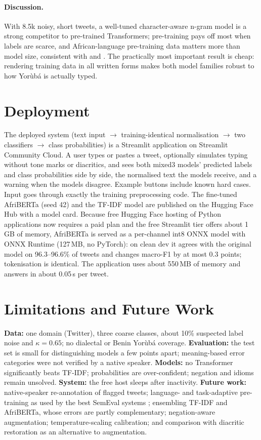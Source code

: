 \documentclass[11pt]{article}
\begin{document}
\paragraph{Discussion.} With 8.5k noisy, short tweets, a well-tuned character-aware n-gram model is a strong competitor to pre-trained Transformers; pre-training pays off most when labels are scarce, and African-language pre-training data matters more than model size, consistent with \citet{ogueji-etal-2021-small} and \citet{muhammad-etal-2023-afrisenti}. The practically most important result is cheap: rendering training data in all written forms makes both model families robust to how Yorùbá is actually typed.

\section{Deployment}
The deployed system (text input $\rightarrow$ training-identical normalisation $\rightarrow$ two classifiers $\rightarrow$ class probabilities) is a Streamlit application \citep{streamlit} on Streamlit Community Cloud. A user types or pastes a tweet, optionally simulates typing without tone marks or diacritics, and sees both mixed3 models' predicted labels and class probabilities side by side, the normalised text the models receive, and a warning when the models disagree. Example buttons include known hard cases. Input goes through exactly the training preprocessing code. The fine-tuned AfriBERTa (seed 42) and the TF-IDF model are published on the Hugging Face Hub with a model card. Because free Hugging Face hosting of Python applications now requires a paid plan and the free Streamlit tier offers about 1\,GB of memory, AfriBERTa is served as a per-channel int8 ONNX model with ONNX Runtime \citep{onnxruntime} (127\,MB, no PyTorch): on clean dev it agrees with the original model on 96.3--96.6\% of tweets and changes macro-F1 by at most 0.3 points; tokenisation is identical. The application uses about 550\,MB of memory and answers in about 0.05\,s per tweet.

\section{Limitations and Future Work}
\textbf{Data:} one domain (Twitter), three coarse classes, about 10\% suspected label noise and $\kappa=0.65$; no dialectal or Benin Yorùbá coverage. \textbf{Evaluation:} the test set is small for distinguishing models a few points apart; meaning-based error categories were not verified by a native speaker. \textbf{Models:} no Transformer significantly beats TF-IDF; probabilities are over-confident; negation and idioms remain unsolved. \textbf{System:} the free host sleeps after inactivity. \textbf{Future work:} native-speaker re-annotation of flagged tweets; language- and task-adaptive pre-training as used by the best SemEval systems \citep{wang-etal-2023-nlnde}; ensembling TF-IDF and AfriBERTa, whose errors are partly complementary; negation-aware augmentation; temperature-scaling calibration; and comparison with diacritic restoration \citep{orife-2018-attentive} as an alternative to augmentation.
\end{document}
